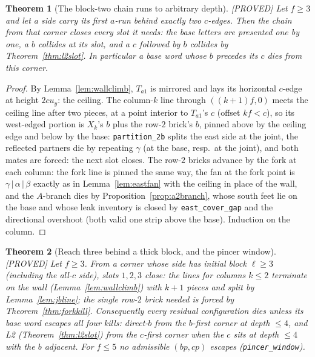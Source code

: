 \documentclass[11pt,reqno]{amsart}
\theoremstyle{plain}
\newtheorem{theorem}{Theorem}
\theoremstyle{definition}
\newcommand{\lab}[1]{\hfill\textnormal{\footnotesize\textsc{[#1]}}}
\begin{document}
\begin{theorem}[The block-two chain runs to arbitrary depth]\label{thm:elltwo}\lab{PROVED}
Let $f\ge3$ and let a side carry its first $a$-run behind exactly two $c$-edges. Then the chain
from that corner closes every slot it needs: the base letters are presented one by one, a $b$
collides at its slot, and a $c$ followed by $b$ collides by Theorem~\ref{thm:l2slot}. In
particular a base word whose $b$ precedes its $c$ dies from this corner.
\end{theorem}
\begin{proof}
By Lemma~\ref{lem:wallclimb}, $T_{a1}$ is mirrored and lays its horizontal $c$-edge at height
$2cu_y$: the ceiling. The column-$k$ line through $((k+1)f,0)$ meets the ceiling line after two
pieces, at a point interior to $T_{a1}$'s $c$ (offset $kf<c$), so its west-edged portion is
$X_k$'s $b$ plus the row-$2$ brick's $b$, pinned above by the ceiling edge and below by the base:
\texttt{partition\_2b} splits the east side at the joint, the reflected partners die by repeating
$\gamma$ (at the base, resp.\ at the joint), and both mates are forced: the next slot closes. The
row-$2$ bricks advance by the fork at each column: the fork line is pinned the same way, the fan
at the fork point is $\gamma\,|\,\alpha\,|\,\beta$ exactly as in Lemma~\ref{lem:eastfan} with the
ceiling in place of the wall, and the $A$-branch dies by Proposition~\ref{prop:a2branch}, whose
south feet lie on the base and whose leak inventory is closed by \texttt{east\_cover\_gap} and
the directional overshoot (both valid one strip above the base). Induction on the column.
\end{proof}

\begin{theorem}[Reach three behind a thick block, and the pincer window]\label{thm:depthwindow}\lab{PROVED}
Let $f\ge3$. From a corner whose side has initial block $\ell\ge3$ (including the all-$c$ side),
slots $1,2,3$ close: the lines for columns $k\le2$ terminate on the wall
(Lemma~\ref{lem:wallclimb}) with $k+1$ pieces and split by Lemma~\ref{lem:jbline}; the single
row-$2$ brick needed is forced by Theorem~\ref{thm:forkkill}. Consequently every residual
configuration dies unless its base word escapes all four kills: direct-$b$ from the $b$-first
corner at depth $\le4$, and L2 (Theorem~\ref{thm:l2slot}) from the $c$-first corner when the $c$
sits at depth $\le4$ with the $b$ adjacent. For $f\le5$ no admissible $(bp,cp)$ escapes
(\texttt{pincer\_window}).
\end{theorem}
\end{document}

